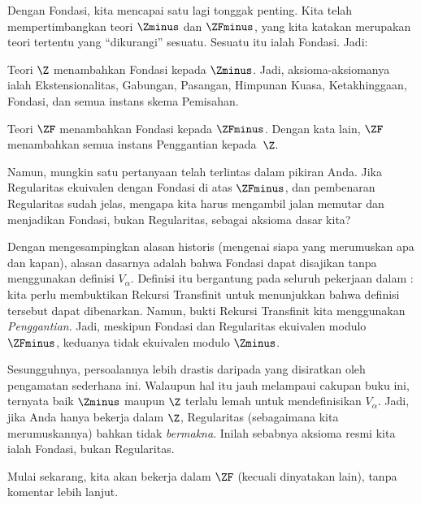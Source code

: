 \documentclass[../../../include/open-logic-section]{subfiles}
\begin{document}

Dengan Fondasi, kita mencapai satu lagi tonggak penting. Kita telah
mempertimbangkan teori $\Zminus$ dan $\ZFminus$, yang kita katakan merupakan
teori tertentu yang ``dikurangi'' sesuatu. Sesuatu itu ialah Fondasi. Jadi:

\begin{defn}
Teori $\Z$ menambahkan Fondasi kepada $\Zminus$. Jadi, aksioma-aksiomanya
ialah Ekstensionalitas, Gabungan, Pasangan, Himpunan Kuasa, Ketakhinggaan,
Fondasi, dan semua instans skema Pemisahan.

Teori $\ZF$ menambahkan Fondasi kepada $\ZFminus$. Dengan kata lain, $\ZF$
menambahkan semua instans Penggantian kepada~$\Z$.
\end{defn}

Namun, mungkin satu pertanyaan telah terlintas dalam pikiran Anda. Jika
Regularitas ekuivalen dengan Fondasi di atas $\ZFminus$, dan pembenaran
Regularitas sudah jelas, mengapa kita harus mengambil jalan memutar dan
menjadikan Fondasi, bukan Regularitas, sebagai aksioma dasar kita?

Dengan mengesampingkan alasan historis (mengenai siapa yang merumuskan apa
dan kapan), alasan dasarnya adalah bahwa Fondasi dapat disajikan tanpa
menggunakan definisi $V_\alpha$. Definisi itu bergantung pada seluruh
pekerjaan dalam : kita perlu membuktikan Rekursi
Transfinit untuk menunjukkan bahwa definisi tersebut dapat dibenarkan.
Namun, bukti Rekursi Transfinit kita menggunakan \emph{Penggantian}. Jadi,
meskipun Fondasi dan Regularitas ekuivalen modulo $\ZFminus$, keduanya tidak
ekuivalen modulo $\Zminus$.

Sesungguhnya, persoalannya lebih drastis daripada yang disiratkan oleh
pengamatan sederhana ini. Walaupun hal itu jauh melampaui cakupan buku ini,
ternyata baik $\Zminus$ maupun $\Z$ terlalu lemah untuk mendefinisikan
$V_\alpha$. Jadi, jika Anda hanya bekerja dalam $\Z$, Regularitas (sebagaimana
kita merumuskannya) bahkan tidak \emph{bermakna}. Inilah sebabnya aksioma
resmi kita ialah Fondasi, bukan Regularitas.

Mulai sekarang, kita akan bekerja dalam $\ZF$ (kecuali dinyatakan lain),
tanpa komentar lebih lanjut.
\end{document}
